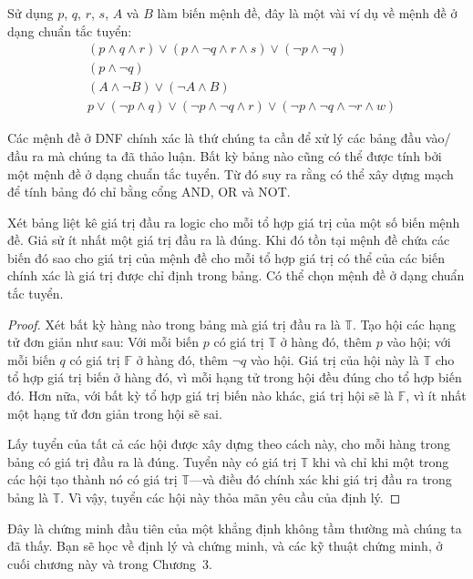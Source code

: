 Sử dụng $p$, $q$, $r$, $s$, $A$ và $B$ làm biến mệnh đề, đây là một vài ví dụ về mệnh đề ở dạng chuẩn tắc tuyển:
\begin{align*}
& (p \land q \land r) \lor (p \land \lnot q \land r \land s) \lor (\lnot p \land \lnot q) \\
& (p \land \lnot q) \\
& (A \land \lnot B) \lor (\lnot A \land B) \\
& p \lor (\lnot p \land q) \lor (\lnot p \land \lnot q \land r) \lor (\lnot p \land \lnot q \land \lnot r \land w)
\end{align*}

Các mệnh đề ở DNF chính xác là thứ chúng ta cần để xử lý các bảng đầu vào/đầu ra mà chúng ta đã thảo luận. Bất kỳ bảng nào cũng có thể được tính bởi một mệnh đề ở dạng chuẩn tắc tuyển. Từ đó suy ra rằng có thể xây dựng mạch để tính bảng đó chỉ bằng cổng AND, OR và NOT.

\begin{theorem}
Xét bảng liệt kê giá trị đầu ra logic cho mỗi tổ hợp giá trị của một số biến mệnh đề. Giả sử ít nhất một giá trị đầu ra là đúng. Khi đó tồn tại mệnh đề chứa các biến đó sao cho giá trị của mệnh đề cho mỗi tổ hợp giá trị có thể của các biến chính xác là giá trị được chỉ định trong bảng. Có thể chọn mệnh đề ở dạng chuẩn tắc tuyển.
\end{theorem}

\begin{proof}
Xét bất kỳ hàng nào trong bảng mà giá trị đầu ra là $\mathbb{T}$. Tạo hội các hạng tử đơn giản như sau: Với mỗi biến $p$ có giá trị $\mathbb{T}$ ở hàng đó, thêm $p$ vào hội; với mỗi biến $q$ có giá trị $\mathbb{F}$ ở hàng đó, thêm $\lnot q$ vào hội. Giá trị của hội này là $\mathbb{T}$ cho tổ hợp giá trị biến ở hàng đó, vì mỗi hạng tử trong hội đều đúng cho tổ hợp biến đó. Hơn nữa, với bất kỳ tổ hợp giá trị biến nào khác, giá trị hội sẽ là $\mathbb{F}$, vì ít nhất một hạng tử đơn giản trong hội sẽ sai.

Lấy tuyển của tất cả các hội được xây dựng theo cách này, cho mỗi hàng trong bảng có giá trị đầu ra là đúng. Tuyển này có giá trị $\mathbb{T}$ khi và chỉ khi một trong các hội tạo thành nó có giá trị $\mathbb{T}$---và điều đó chính xác khi giá trị đầu ra trong bảng là $\mathbb{T}$. Vì vậy, tuyển các hội này thỏa mãn yêu cầu của định lý.
\end{proof}

\begin{infobox}
Đây là chứng minh đầu tiên của một khẳng định không tầm thường mà chúng ta đã thấy. Bạn sẽ học về định lý và chứng minh, và các kỹ thuật chứng minh, ở cuối chương này và trong Chương~3.
\end{infobox}

